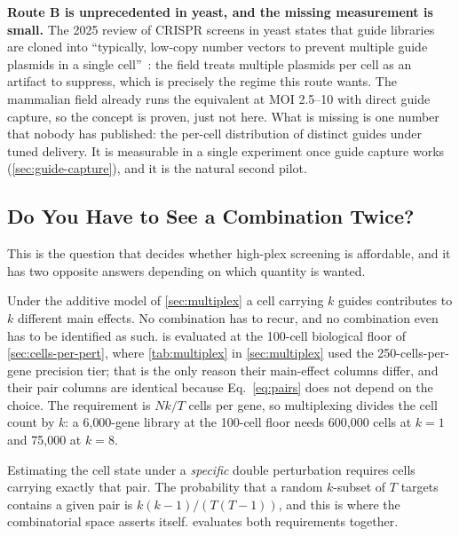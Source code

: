 \begin{keybox}
\textbf{Route B is unprecedented in yeast, and the missing measurement is small.}
The 2025 review of CRISPR screens in yeast states that guide libraries are cloned
into ``typically, low-copy number vectors to prevent multiple guide plasmids in a
single cell''~\citep{robertsonAdvancesCRISPRenabledGenomewide2025}: the field treats
multiple plasmids per cell as an artifact to suppress, which is precisely the
regime this route wants. The mammalian field already runs the equivalent at MOI
2.5--10 with direct guide capture, so the concept is proven, just not here. What
is missing is one number that nobody has published: the per-cell distribution of
distinct guides under tuned delivery. It is measurable in a single experiment
once guide capture works (\cref{sec:guide-capture}), and it is the natural second
pilot.
\end{keybox}

\subsection{Do You Have to See a Combination Twice?}
\label{sec:recovery}

This is the question that decides whether high-plex screening is affordable, and
it has two opposite answers depending on which quantity is wanted.

 Under the additive model of
\cref{sec:multiplex} a cell carrying $k$ guides contributes to $k$ different main
effects. No combination has to recur, and no combination even has to be
identified as such.  is evaluated at the 100-cell biological
floor of \cref{sec:cells-per-pert}, where \cref{tab:multiplex} in
\cref{sec:multiplex} used the 250-cells-per-gene precision tier; that is the only
reason their main-effect columns differ, and their pair columns are identical
because Eq.~\ref{eq:pairs} does not depend on the choice. The requirement is
$Nk/T$ cells per gene, so multiplexing
divides the cell count by $k$: a 6{,}000-gene library at the 100-cell floor needs
600{,}000 cells at $k=1$ and 75{,}000 at $k=8$.

 Estimating the cell state under a \emph{specific} double perturbation
requires cells carrying exactly that pair. The probability that a random
$k$-subset of $T$ targets contains a given pair is $k(k-1)/(T(T-1))$, and this is
where the combinatorial space asserts itself.  evaluates both
requirements together.

